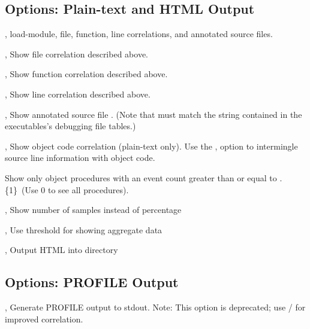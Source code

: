 \documentclass[english]{article}
\begin{document}
\subsection{Options: Plain-text and HTML Output}
\begin{Description}
  \item[\Opt{-e}, \Opt{--everything}] load-module, file, function, line correlations, and annotated source files.
  \item[\Opt{-f}, \Opt{--files}] Show file correlation described above.
  \item[\Opt{-r}, \Opt{--funcs}] Show function correlation described above.
  \item[\Opt{-l}, \Opt{--lines}] Show line correlation described above.
  \item[\OptArg{-a}{file}, \OptArg{--annotate}{file}] Show annotated source file .  (Note that  must match the string contained in the executables's debugging file tables.)

  \item[\Opt{-o}, \Opt{--object}] Show object code correlation (plain-text only).  Use the ,  option to intermingle source line information with object code.
  \item[\Opt{--othreshold}] Show only object procedures with an event count greater than or equal to .  \{1\}\  (Use 0 to see all procedures).

  \item[\Opt{-n}, \Opt{--number}] Show number of samples instead of percentage
  \item[\OptArg{-s}{n}, \OptArg{--show}{n}] Use threshold  for showing aggregate data
  \item[\OptArg{-H}{dir}, \OptArg{--html}{dir}] Output HTML into directory 
\end{Description}

\subsection{Options: PROFILE Output}
\begin{Description}
  \item[\Opt{-p}, \Opt{--profile}] Generate PROFILE output to stdout. Note: This option is deprecated; use / for improved correlation.
\end{Description}



\end{document}

